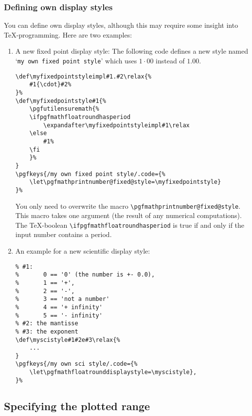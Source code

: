 \subsubsection{Defining own display styles}
You can define own display styles, although this may require some insight into \TeX-programming. Here are two examples:
\begin{enumerate}
	\item A new fixed point display style: The following code defines a new style named `\texttt{my own fixed point style}' which uses $1{\cdot}00$ instead of $1.00$.
\begin{lstlisting}
\def\myfixedpointstyleimpl#1.#2\relax{%
	#1{\cdot}#2%
}%
\def\myfixedpointstyle#1{%
	\pgfutilensuremath{%
	\ifpgfmathfloatroundhasperiod
		\expandafter\myfixedpointstyleimpl#1\relax
	\else
		#1%
	\fi
	}%
}
\pgfkeys{/my own fixed point style/.code={%
	\let\pgfmathprintnumber@fixed@style=\myfixedpointstyle}
}%
\end{lstlisting}
	You only need to overwrite the macro \lstinline!\pgfmathprintnumber@fixed@style!. This macro takes one argument (the result of any numerical computations). The \TeX-boolean \lstinline!\ifpgfmathfloatroundhasperiod! is true if and only if the input number contains a period.

	\item An example for a new scientific display style:
\begin{lstlisting}
% #1:
% 		0 == '0' (the number is +- 0.0),
% 		1 == '+', 
% 		2 == '-',
% 		3 == 'not a number'
% 		4 == '+ infinity'
% 		5 == '- infinity'
% #2: the mantisse
% #3: the exponent
\def\myscistyle#1#2e#3\relax{%
	...
}
\pgfkeys{/my own sci style/.code={%
	\let\pgfmathfloatrounddisplaystyle=\myscistyle},
}%
\end{lstlisting}
\end{enumerate}
\endgroup




\subsection{Specifying the plotted range}

